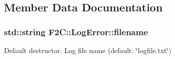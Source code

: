 \subsection{Member Data Documentation}
\hypertarget{class_f2_c_1_1_log_error_aa5dc474b29884812c02be68e1c45c56e}{
\subsubsection[{filename}]{\setlength{\rightskip}{0pt plus 5cm}std::string {\bf F2C::LogError::filename}}}
\label{class_f2_c_1_1_log_error_aa5dc474b29884812c02be68e1c45c56e}


Default destructor. Log file name (default: \char`\"{}logfile.txt\char`\"{}) 